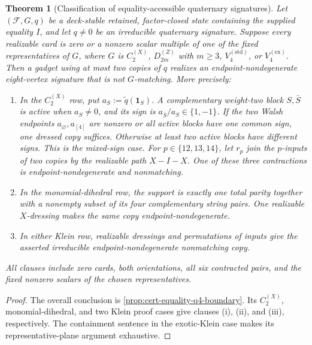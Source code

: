 \documentclass[11pt,letterpaper,onecolumn]{article}
\theoremstyle{plain}
\newtheorem{theorem}{Theorem}[section]
\theoremstyle{definition}
\theoremstyle{remark}
\newcommand{\cF}{\mathcal F}
\newcommand{\DihZ}[1]{{D_{#1}^{(Z)}}}
\newcommand{\CycX}[1]{{C_{#1}^{(X)}}}
\newcommand{\KleinStd}{{V_4^{(\mathrm{std})}}}
\newcommand{\KleinEx}{{V_4^{(\mathrm{ex})}}}
\newcommand{\one}{\mathbf 1}
\begin{document}
\begin{theorem}[Classification of equality-accessible quaternary signatures]
\label{thm:cert-interface-equality-q4}
Let \((\cF,G,q)\) be a deck-stable retained, factor-closed state
containing the supplied equality \(I\), and let \(q\ne0\) be an
irreducible quaternary signature.  Suppose every realizable card is zero or a
nonzero scalar multiple of one of the fixed representatives of \(G\), where
\(G\) is \(\CycX{2}\), \(\DihZ{2m}\) with \(m\ge3\), \(\KleinStd\), or \(\KleinEx\).
Then a gadget using at most two copies of \(q\) realizes an
endpoint-nondegenerate eight-vertex signature that is not \(G\)-matching.
More precisely:
\begin{enumerate}[label=\textnormal{(\roman*)}]
\item In the \(\CycX{2}\) row, put
      \(a_S:=\widetilde q(\one_S)\).  A complementary weight-two block
      \(S,\bar S\) is \emph{active} when \(a_S\ne0\), and its sign is
      \(a_{\bar S}/a_S\in\{1,-1\}\).  If the two Walsh endpoints
      \(a_\varnothing,a_{[4]}\) are nonzero or all active blocks have one
      common sign, one dressed copy suffices.  Otherwise at least two active
      blocks have different signs. This is the \emph{mixed-sign} case.  For
      \(p\in\{12,13,14\}\), let \(r_p\) join the \(p\)-inputs of two copies
      by the realizable path \(X-I-X\).  One of these three contractions is
      endpoint-nondegenerate and nonmatching.
\item In the monomial-dihedral row, the support is exactly one total
      parity together with a nonempty subset of its four complementary string
      pairs.  One realizable \(X\)-dressing makes the same copy
      endpoint-nondegenerate.
\item In either Klein row, realizable dressings and permutations of inputs give the
      asserted irreducible endpoint-nondegenerate nonmatching copy.
\end{enumerate}
All clauses include zero cards, both orientations, all six contracted pairs,
and the fixed nonzero scalars of the chosen representatives.
\end{theorem}

\begin{proof}
The overall conclusion is \cref{prop:cert-equality-q4-boundary}.  Its
\(\CycX{2}\), monomial-dihedral, and two Klein proof cases give clauses
\textnormal{(i)}, \textnormal{(ii)}, and \textnormal{(iii)}, respectively.
The containment sentence in the exotic-Klein case makes its
representative-plane argument exhaustive.
\end{proof}
\end{document}
